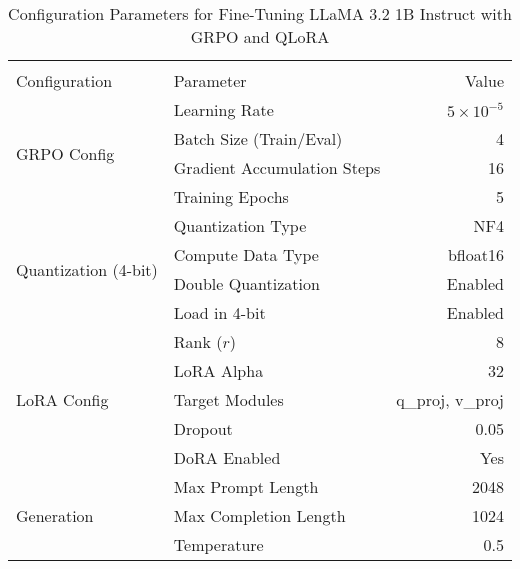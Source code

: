 \vspace*{-\baselineskip}
\vspace*{-\baselineskip}
\begin{table}[H]
  \centering
  \begin{tabular}{llr}
    \toprule \\
    Configuration & Parameter & Value \\
    \midrule
    \multirow{4}{*}{GRPO Config} 
      & Learning Rate & \(5 \times 10^{-5}\) \\
      & Batch Size (Train/Eval) & 4 \\
      & Gradient Accumulation Steps & 16 \\
      & Training Epochs & 5 \\
    \midrule
    \multirow{4}{*}{Quantization (4-bit)} 
      & Quantization Type & NF4 \\
      & Compute Data Type & bfloat16 \\
      & Double Quantization & Enabled \\
      & Load in 4-bit & Enabled \\
    \midrule
    \multirow{5}{*}{LoRA Config} 
      & Rank (\(r\)) & 8 \\
      & LoRA Alpha & 32 \\
      & Target Modules & q\_proj, v\_proj \\
      & Dropout & 0.05 \\
      & DoRA Enabled & Yes \\
    \midrule
    \multirow{3}{*}{Generation} 
      & Max Prompt Length & 2048 \\
      & Max Completion Length & 1024 \\
      & Temperature & 0.5 \\
    \bottomrule
  \end{tabular}
  \vspace{0.2cm}
  \caption{Configuration Parameters for Fine-Tuning LLaMA 3.2 1B Instruct with GRPO and QLoRA}
  \label{tab:training_config}
\end{table}
\vspace*{-\baselineskip}